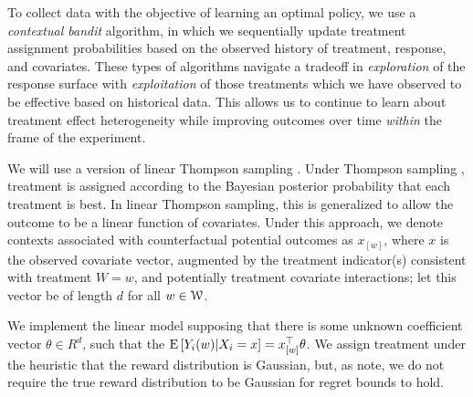 \documentclass[letterpaper, 12pt, parskip=full,DIV=10]{scrartcl}
\begin{document}
To collect data with the objective of learning an optimal policy, we use a \textit{contextual bandit} algorithm, in which we sequentially update treatment assignment probabilities based on the observed history of treatment, response, and covariates. These types of algorithms navigate a tradeoff in \textit{exploration} of the response surface with \textit{exploitation} of those treatments which we have observed to be effective based on historical data. This allows us to continue to learn about treatment effect heterogeneity while improving outcomes over time \textit{within} the frame of the experiment. 

We will use a version of linear Thompson sampling \citep{agrawal2013thompson}. Under Thompson sampling \citep{thompson1933likelihood,thompson1935theory}, treatment is assigned according to the Bayesian posterior probability that each treatment is best. In linear Thompson sampling, this is generalized to allow the outcome to be a linear function of covariates. Under this approach, we denote contexts associated with counterfactual potential outcomes as $x_{[w]}$, where $x$ is the observed covariate vector, augmented by the treatment indicator(s) consistent with treatment $W =w$, and potentially treatment covariate interactions; let this vector be of length $d$ for all $w \in {\EuScript W}$. 

We implement the linear model supposing that there is some unknown coefficient vector $\theta\in R^{d}$, such that the ${\textrm E}\,[Y_i(w)|X_i = x] = x_{[w]}^\top \theta$. %
We assign treatment under the heuristic that the reward distribution is Gaussian, but, as \cite{agrawal2013thompson} note, we do not require the true reward distribution to be Gaussian for regret bounds to hold. 

\end{document}
